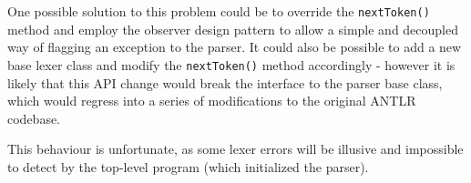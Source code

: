 One possible solution to this problem could be to override the
\verb!nextToken()! method and employ the observer design
pattern\cite{elements_of_oop} to allow a  simple and decoupled way of flagging
an exception to the parser. It could also be possible to add a new base lexer
class and modify the \verb!nextToken()! method accordingly - however it is
likely that this API change would break the interface to the parser base class,
which would regress into a series of modifications to the original ANTLR
codebase. 

This behaviour is unfortunate, as some lexer errors will be illusive and
impossible to detect by the top-level program (which initialized the parser). 